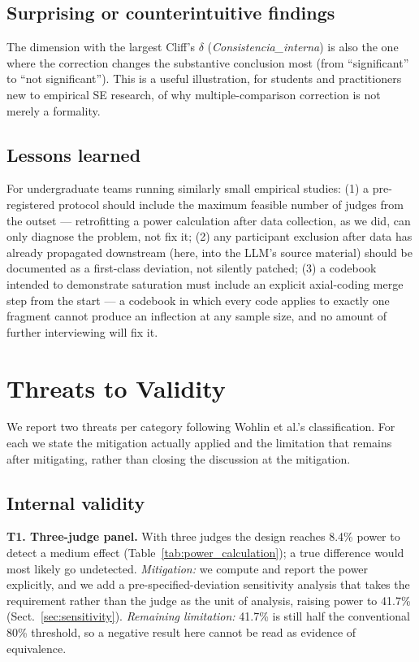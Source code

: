 \documentclass{llncs}
\begin{document}
\subsection{Surprising or counterintuitive findings}
The dimension with the largest Cliff's $\delta$ (\emph{Consistencia\_interna}) is also the
one where the correction changes the substantive conclusion most (from ``significant''
to ``not significant''). This is a useful illustration, for students and practitioners
new to empirical SE research, of why multiple-comparison correction is not merely a
formality.

\subsection{Lessons learned}
For undergraduate teams running similarly small empirical studies: (1) a
pre-registered protocol should include the maximum feasible number of judges from the
outset --- retrofitting a power calculation after data collection, as we did, can only
diagnose the problem, not fix it; (2) any participant exclusion after data has already
propagated downstream (here, into the LLM's source material) should be documented as a
first-class deviation, not silently patched; (3) a codebook intended to demonstrate
saturation must include an explicit axial-coding merge step from the start --- a codebook
in which every code applies to exactly one fragment cannot produce an inflection at any
sample size, and no amount of further interviewing will fix it.

\section{Threats to Validity}
\label{sec:threats}

We report two threats per category following Wohlin et al.'s classification. For
each we state the mitigation actually applied and the limitation that remains
after mitigating, rather than closing the discussion at the mitigation.

\subsection{Internal validity}

\textbf{T1. Three-judge panel.} With three judges the design reaches 8.4\% power
to detect a medium effect (Table~\ref{tab:power_calculation}); a true difference
would most likely go undetected. \emph{Mitigation:} we compute and report the
power explicitly, and we add a pre-specified-deviation sensitivity analysis that
takes the requirement rather than the judge as the unit of analysis, raising
power to 41.7\% (Sect.~\ref{sec:sensitivity}). \emph{Remaining limitation:}
41.7\% is still half the conventional 80\% threshold, so a negative result here
cannot be read as evidence of equivalence.
\end{document}
